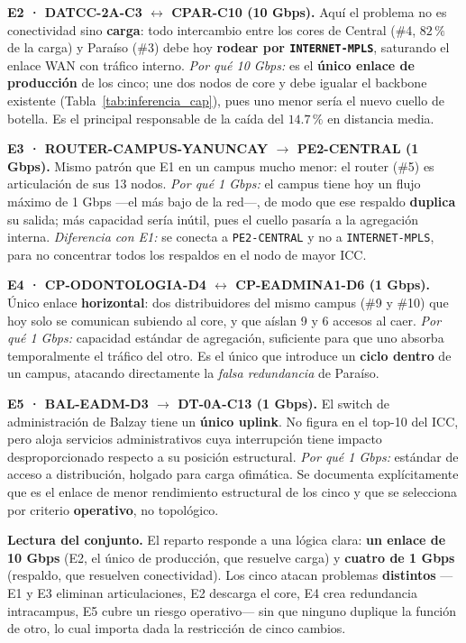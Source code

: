 \documentclass[11pt, a4paper]{article}
\begin{document}
\textbf{E2 · DATCC-2A-C3 $\leftrightarrow$ CPAR-C10 (10 Gbps).} Aquí el
problema no es conectividad sino \textbf{carga}: todo intercambio entre los
cores de Central (\#4, $82\,\%$ de la carga) y Paraíso (\#3) debe hoy
\textbf{rodear por \texttt{INTERNET-MPLS}}, saturando el enlace WAN con
tráfico interno. \textit{Por qué 10 Gbps:} es el \textbf{único enlace de
producción} de los cinco; une dos nodos de core y debe igualar el backbone
existente (Tabla~\ref{tab:inferencia_cap}), pues uno menor sería el nuevo
cuello de botella. Es el principal responsable de la caída del $14.7\,\%$
en distancia media.

\textbf{E3 · ROUTER-CAMPUS-YANUNCAY $\to$ PE2-CENTRAL (1 Gbps).} Mismo
patrón que E1 en un campus mucho menor: el router (\#5) es articulación de
sus 13 nodos. \textit{Por qué 1 Gbps:} el campus tiene hoy un flujo máximo
de 1 Gbps —el más bajo de la red—, de modo que ese respaldo \textbf{duplica}
su salida; más capacidad sería inútil, pues el cuello pasaría a la
agregación interna. \textit{Diferencia con E1:} se conecta a
\texttt{PE2-CENTRAL} y no a \texttt{INTERNET-MPLS}, para no concentrar
todos los respaldos en el nodo de mayor ICC.

\textbf{E4 · CP-ODONTOLOGIA-D4 $\leftrightarrow$ CP-EADMINA1-D6 (1 Gbps).}
Único enlace \textbf{horizontal}: dos distribuidores del mismo campus
(\#9 y \#10) que hoy solo se comunican subiendo al core, y que aíslan 9 y 6
accesos al caer. \textit{Por qué 1 Gbps:} capacidad estándar de agregación,
suficiente para que uno absorba temporalmente el tráfico del otro. Es el
único que introduce un \textbf{ciclo dentro} de un campus, atacando
directamente la \textit{falsa redundancia} de Paraíso.

\textbf{E5 · BAL-EADM-D3 $\to$ DT-0A-C13 (1 Gbps).} El switch de
administración de Balzay tiene un \textbf{único uplink}. No figura en el
top-10 del ICC, pero aloja servicios administrativos cuya interrupción
tiene impacto desproporcionado respecto a su posición estructural.
\textit{Por qué 1 Gbps:} estándar de acceso a distribución, holgado para
carga ofimática. Se documenta explícitamente que es el enlace de menor
rendimiento estructural de los cinco y que se selecciona por criterio
\textbf{operativo}, no topológico.

\textbf{Lectura del conjunto.} El reparto responde a una lógica clara:
\textbf{un enlace de 10 Gbps} (E2, el único de producción, que resuelve
carga) y \textbf{cuatro de 1 Gbps} (respaldo, que resuelven conectividad).
Los cinco atacan problemas \textbf{distintos} —E1 y E3 eliminan
articulaciones, E2 descarga el core, E4 crea redundancia intracampus, E5
cubre un riesgo operativo— sin que ninguno duplique la función de otro, lo
cual importa dada la restricción de cinco cambios.
\end{document}
